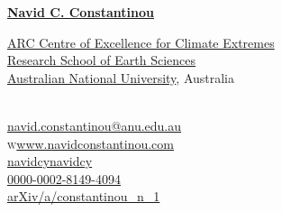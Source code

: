 \documentclass[10pt, letter]{article}
\def\www{http://www.navidconstantinou.com}
\newcommand{\rses}{
\href{http://rses.anu.edu.au}{\color{black}Research School of Earth Sciences}}
\newcommand{\clex}{
\href{http://climateextremes.org.au}{\color{black}ARC Centre of Excellence for Climate Extremes}}
\newcommand{\anu}{
\href{http://www.anu.edu.au}{\color{black}Australian National University}}
\begin{document}
\reversemarginpar
{\huge{ \href{http://www.navidconstantinou.com}{\color{jhublue}\bf Navid C. Constantinou}}}\\[.42cm]
\parbox{.57\linewidth}{
\clex\\
\rses\\
\anu, Australia\\
\mbox{}\\
}
\parbox{.43\linewidth}{
{}\hspace{.26cm}\href{mailto:navid.constantinou@anu.edu.au}{navid.constantinou@anu.edu.au}\\
\textsc{w}\hspace{.24cm}\href{\www}{www.navidconstantinou.com}\\
\faGithub\hspace{.24cm}\href{https://github.com/navidcy}{navidcy}\hspace{3.9em}\faVimeo\hspace{.24cm}\href{https://vimeo.com/navidcy}{navidcy}\\
{}\hspace{.24cm}\href{http://orcid.org/0000-0002-8149-4094}{0000-0002-8149-4094}\\
{}\hspace{.24cm}\href{https://arxiv.org/a/constantinou_n_1.html}{arXiv/a/constantinou\_n\_1}}






%
%
%






\end{document}
